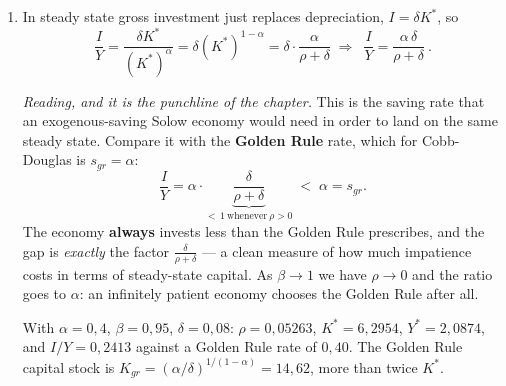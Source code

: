 \documentclass[12pt, letterpaper]{article}
\newcommand{\stst}{^{\ast}}
\begin{document}
\begin{tcolorbox}[oddbox,title={Problem 9.11 \quad Patience and Investment}]
\begin{enumerate}
\item In steady state gross investment just replaces depreciation, $I=\delta K\stst$, so
\[
\frac{I}{Y}=\frac{\delta K\stst}{(K\stst)^{\alpha}}=\delta (K\stst)^{1-\alpha}
=\delta\cdot\frac{\alpha}{\rho+\delta}
\;\Longrightarrow\;
\boxed{\ \frac{I}{Y}=\frac{\alpha\,\delta}{\rho+\delta}\ }.
\]

\emph{Reading, and it is the punchline of the chapter.} This is the saving rate that an
exogenous-saving Solow economy would need in order to land on the same steady state. Compare it
with the \textbf{Golden Rule} rate, which for Cobb-Douglas is $s_{gr}=\alpha$:
\[
\frac{I}{Y}=\alpha\cdot\underbrace{\frac{\delta}{\rho+\delta}}_{<\,1\ \text{whenever}\ \rho>0}
\;<\;\alpha=s_{gr}.
\]
The economy \textbf{always} invests less than the Golden Rule prescribes, and the gap is
\emph{exactly} the factor $\frac{\delta}{\rho+\delta}$ --- a clean measure of how much
impatience costs in terms of steady-state capital. As $\beta\to1$ we have $\rho\to0$ and the
ratio goes to $\alpha$: an infinitely patient economy chooses the Golden Rule after all.

\begin{tcolorbox}[databox]
With $\alpha=0{,}4$, $\beta=0{,}95$, $\delta=0{,}08$: $\rho=0{,}05263$,
$K\stst=6{,}2954$, $Y\stst=2{,}0874$, and $I/Y=0{,}2413$ against a Golden Rule rate of
$0{,}40$. The Golden Rule capital stock is
$K_{gr}=(\alpha/\delta)^{1/(1-\alpha)}=14{,}62$, more than twice $K\stst$. \checkmark
\end{tcolorbox}
\end{enumerate}
\end{tcolorbox}
\end{document}

